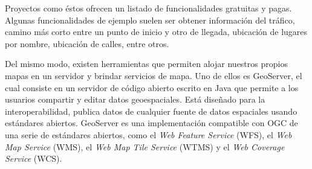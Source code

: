 Proyectos como éstos ofrecen un listado de funcionalidades gratuitas y pagas. Algunas funcionalidades de ejemplo suelen ser obtener información del tráfico, camino más corto entre un punto de inicio y otro de llegada, ubicación de lugares por nombre, ubicación de calles, entre otros.

Del mismo modo, existen herramientas que permiten alojar nuestros propios mapas en un servidor y brindar servicios de mapa. Uno de ellos es GeoServer, el cual consiste en un servidor de código abierto escrito en Java que permite a los usuarios compartir y editar datos geoespaciales. Está diseñado para la interoperabilidad, publica datos de cualquier fuente de datos espaciales usando estándares abiertos. GeoServer es una implementación compatible con OGC de una serie de estándares abiertos, como el \textit{Web Feature Service} (WFS), el \textit{Web Map Service} (WMS), el \textit{Web Map Tile Service} (WTMS) y el \textit{Web Coverage Service} (WCS).